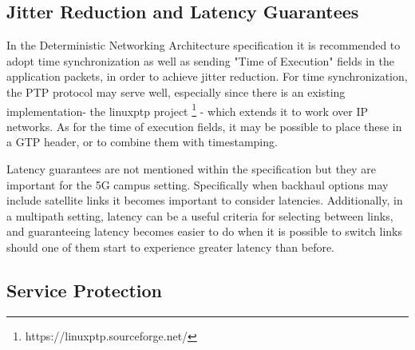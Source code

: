 \subsection{Jitter Reduction and Latency Guarantees}

In the Deterministic Networking Architecture specification it is recommended to adopt time synchronization as well as sending "Time of Execution" fields in the application packets, in order to achieve jitter reduction. For time synchronization, the PTP protocol may serve well, especially since there is an existing implementation- the linuxptp project \footnote{https://linuxptp.sourceforge.net/} -  which extends it to work over IP networks. As for the time of execution fields, it may be possible to place these in a GTP header, or to combine them with timestamping.

Latency guarantees are not mentioned within the specification but they are important for the 5G campus setting. Specifically when backhaul options may include satellite links it becomes important to consider latencies. Additionally, in a multipath setting, latency can be a useful criteria for selecting between links, and guaranteeing latency becomes easier to do when it is possible to switch links should one of them start to experience greater latency than before.

\subsection{Service Protection}

